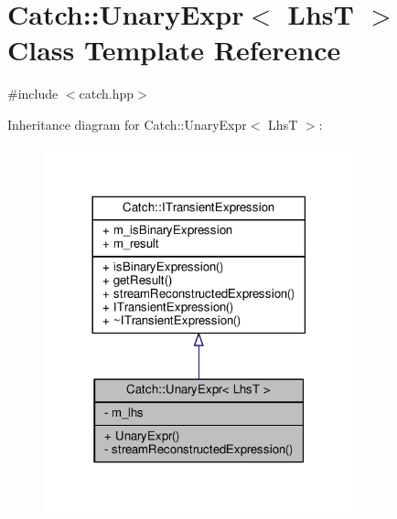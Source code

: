 \hypertarget{class_catch_1_1_unary_expr}{\section{Catch\-:\-:Unary\-Expr$<$ Lhs\-T $>$ Class Template Reference}
\label{class_catch_1_1_unary_expr}
}


{\ttfamily \#include $<$catch.\-hpp$>$}



Inheritance diagram for Catch\-:\-:Unary\-Expr$<$ Lhs\-T $>$\-:
\nopagebreak
\begin{figure}[H]
\begin{center}
\leavevmode
\includegraphics[width=254pt]{class_catch_1_1_unary_expr__inherit__graph}
\end{center}
\end{figure}


